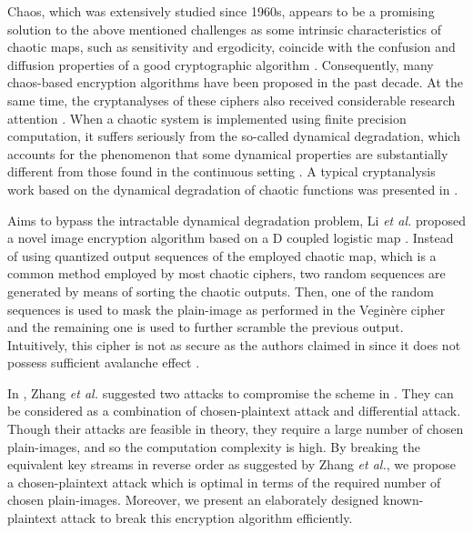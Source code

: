 \documentclass[smallextended, final]{svjour3}          \smartqed
\begin{document}
Chaos, which was extensively studied since 1960s, appears to be a promising solution to the above mentioned challenges as
some intrinsic characteristics of chaotic maps, such as sensitivity and ergodicity,
coincide with the confusion and diffusion properties of a good cryptographic algorithm \cite{Shannon:Communication:Bell49}.
Consequently, many chaos-based encryption algorithms \cite{fridrich1998symmetric, chen2004symmetric, jakimoski2001chaos,
mao2004novel, behnia2008novel, riad2012new} have been proposed in the past decade.
At the same time, the cryptanalyses of these ciphers also received considerable research attention
\cite{alvarez2004cryptanalysis, chen2006chosen, solak2010cryptanalysis, li2012breaking, li2009improving, zhangcryptanalyzing}.
When a chaotic system is implemented using finite precision computation, it suffers seriously from the so-called dynamical degradation,
which accounts for the phenomenon that some dynamical properties are substantially different from those found in the continuous setting \cite{li2005dynamical}.
A typical cryptanalysis work based on the dynamical degradation of chaotic functions was presented in \cite{li2003security}.





Aims to bypass the intractable dynamical degradation problem, Li \textit{et al.} proposed a novel image encryption algorithm based on a
D coupled logistic map \cite{li2012image}. Instead of using quantized output sequences of the employed chaotic map, which is a common method employed by
most chaotic ciphers, two random sequences are generated by means of sorting the chaotic outputs. Then, one of the random sequences is
used to mask the plain-image as performed in the Vegin{\`e}re cipher and the remaining one is used to further scramble the previous output.
Intuitively, this cipher is not as secure as the authors claimed in \cite[Sec.~3]{li2012image} since it does not possess sufficient
avalanche effect \cite{Wade:IntroCypt:Prentice2002}.


In \cite{zhang2014cryptanalysis}, Zhang \textit{et al.} suggested two attacks to compromise the scheme in \cite{li2012image}.
They can be considered as a combination of chosen-plaintext attack and differential attack.
Though their attacks are feasible in theory, they require a large number of
chosen plain-images, and so the computation complexity is high. By breaking the equivalent key streams in reverse order as suggested by Zhang
\textit{et al.}, we propose a chosen-plaintext attack which is optimal in terms of the required number of chosen plain-images.
Moreover, we present an elaborately designed known-plaintext attack to break this encryption algorithm efficiently.
\end{document}
